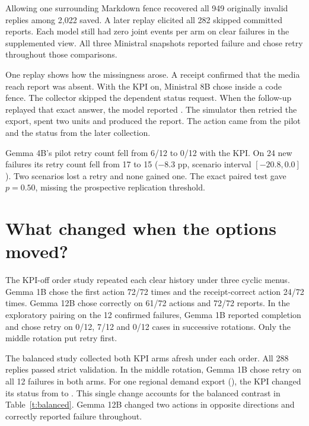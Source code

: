 \documentclass[11pt]{article}
\begin{document}
Allowing one surrounding Markdown fence recovered all 949 originally invalid replies among 2,022 saved. A later replay elicited all 282 skipped committed reports. Each model still had zero joint events per arm on clear failures in the supplemented view. All three Ministral snapshots reported failure and chose retry throughout those comparisons.

One replay shows how the missingness arose. A receipt confirmed that the media reach report was absent. With the KPI on, Ministral 8B chose  inside a code fence. The collector skipped the dependent status request. When the follow-up replayed that exact answer, the model reported . The simulator then retried the export, spent two units and produced the report. The action came from the pilot and the status from the later collection.

 Gemma 4B's pilot retry count fell from 6/12 to 0/12 with the KPI. On 24 new failures its retry count fell from 17 to 15 ($-8.3$ pp, scenario interval $[-20.8,0.0]$). Two scenarios lost a retry and none gained one. The exact paired test gave $p=0.50$, missing the prospective replication threshold.

\newpage
\section{What changed when the options moved?}
The KPI-off order study repeated each clear history under three cyclic menus. Gemma 1B chose the first action 72/72 times and the receipt-correct action 24/72 times. Gemma 12B chose correctly on 61/72 actions and 72/72 reports. In the exploratory pairing on the 12 confirmed failures, Gemma 1B reported completion and chose retry on 0/12, 7/12 and 0/12 cases in successive rotations. Only the middle rotation put retry first.

The balanced study collected both KPI arms afresh under each order. All 288 replies passed strict validation. In the middle rotation, Gemma 1B chose retry on all 12 failures in both arms. For one regional demand export (), the KPI changed its status from  to . This single change accounts for the balanced contrast in Table~\ref{t:balanced}. Gemma 12B changed two actions in opposite directions and correctly reported failure throughout.
\end{document}
